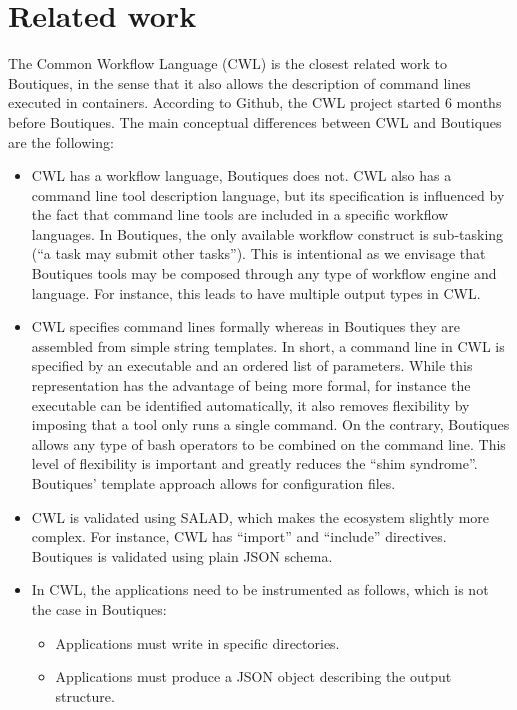 \documentclass{article}
\newcommand{\todo}[2]{\pdfmargincomment[color=red,author=#1,open=true]{#2}}
\begin{document}
\section{Related work}

The Common Workflow Language (CWL) is the closest related work to
Boutiques, in the sense that it also allows the description of command
lines executed in containers. According to Github, the CWL project
started 6 months before Boutiques. The main conceptual differences
between CWL and Boutiques are the following:
\begin{itemize}
\item CWL has a workflow language, Boutiques does not. CWL also has a
  command line tool description language, but its specification is
  influenced by the fact that command line tools are included in a
  specific workflow languages. In Boutiques, the only available
  workflow construct is sub-tasking (``a task may submit other
  tasks''). This is intentional as we envisage that Boutiques tools
  may be composed through any type of workflow engine and language. For instance, this leads to have multiple output types in CWL.
\item CWL specifies command lines formally whereas in Boutiques they
  are assembled from simple string templates. In short, a command line
  in CWL is specified by an executable and an ordered list of
  parameters. While this representation has the advantage of being
  more formal, for instance the executable can be identified
  automatically, it also removes flexibility by imposing that a tool
  only runs a single command. On the contrary, Boutiques allows any
  type of bash operators to be combined on the command line. This
  level of flexibility is important and greatly reduces the ``shim
  syndrome''. Boutiques' template approach allows for configuration files. 
\item CWL is validated using SALAD, which makes the ecosystem slightly
  more complex. For instance, CWL has ``import'' and ``include''
  directives. Boutiques is validated using plain JSON schema. \todo{ontology layer}.
\item In CWL, the applications need to be instrumented as follows, which is not the case in Boutiques:
\begin{itemize}
\item Applications must write in specific directories.
\item Applications must produce a JSON object describing the output structure.
\end{itemize}
\end{itemize}
\end{document}

